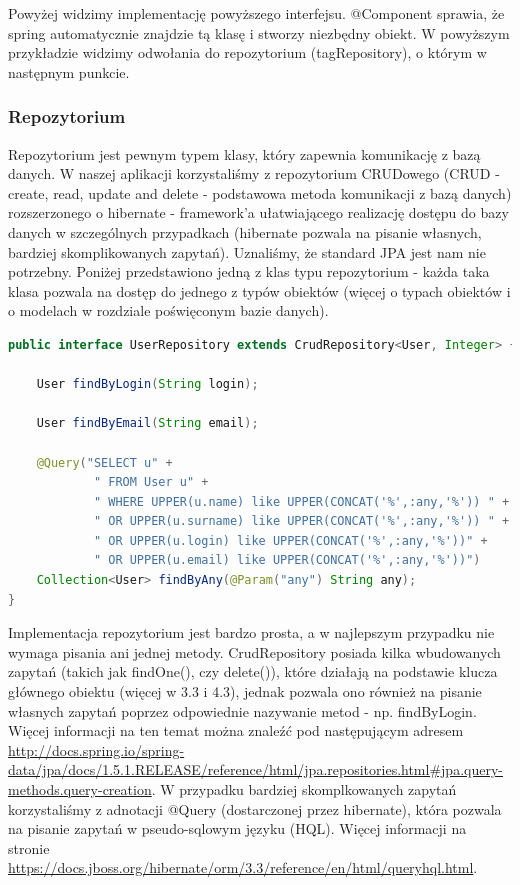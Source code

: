 \documentclass{report}
\begin{document}
Powyżej widzimy implementację powyższego interfejsu. @Component sprawia, że spring automatycznie znajdzie tą klasę i stworzy niezbędny obiekt. W powyższym przykładzie widzimy odwołania do repozytorium (tagRepository), o którym w następnym punkcie.

			\subsubsection{Repozytorium}
			
			
Repozytorium jest pewnym typem klasy, który zapewnia komunikację z bazą danych. W naszej aplikacji korzystaliśmy z repozytorium CRUDowego (CRUD - create, read, update and delete - podstawowa metoda komunikacji z bazą danych) rozszerzonego o hibernate - framework'a ułatwiającego realizację dostępu do bazy danych w szczególnych przypadkach (hibernate pozwala na pisanie własnych, bardziej skomplikowanych zapytań). Uznaliśmy, że standard JPA jest nam nie potrzebny. Poniżej przedstawiono jedną z klas typu repozytorium - każda taka klasa pozwala na dostęp do jednego z typów obiektów (więcej o typach obiektów i o modelach w rozdziale poświęconym bazie danych).

\begin{lstlisting}[language=Java, breaklines]
public interface UserRepository extends CrudRepository<User, Integer> {

    User findByLogin(String login);

    User findByEmail(String email);

    @Query("SELECT u" +
            " FROM User u" +
            " WHERE UPPER(u.name) like UPPER(CONCAT('%',:any,'%')) " +
            " OR UPPER(u.surname) like UPPER(CONCAT('%',:any,'%')) " +
            " OR UPPER(u.login) like UPPER(CONCAT('%',:any,'%'))" +
            " OR UPPER(u.email) like UPPER(CONCAT('%',:any,'%'))")
    Collection<User> findByAny(@Param("any") String any);
}
\end{lstlisting}

Implementacja repozytorium jest bardzo prosta, a w najlepszym przypadku nie wymaga pisania ani jednej metody. CrudRepository posiada kilka wbudowanych zapytań (takich jak findOne(), czy delete()), które działają na podstawie klucza głównego obiektu (więcej w 3.3 i 4.3), jednak pozwala ono również na pisanie własnych zapytań poprzez odpowiednie nazywanie metod - np. findByLogin. Więcej informacji na ten temat można znaleźć pod następującym adresem \url{http://docs.spring.io/spring-data/jpa/docs/1.5.1.RELEASE/reference/html/jpa.repositories.html#jpa.query-methods.query-creation}. W przypadku bardziej skomplkowanych zapytań korzystaliśmy z adnotacji @Query (dostarczonej przez hibernate), która pozwala na pisanie zapytań w pseudo-sqlowym języku (HQL). Więcej informacji na stronie \url{https://docs.jboss.org/hibernate/orm/3.3/reference/en/html/queryhql.html}.
			
\end{document}
